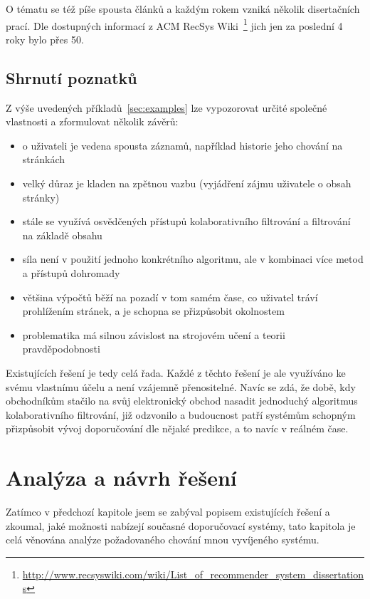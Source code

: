 \documentclass[thesis=M,czech]{FITthesis}[2014/05/07]
\begin{document}
O tématu se též píše spousta článků a každým rokem vzniká několik disertačních prací. Dle dostupných informací z ACM RecSys Wiki~\footnote{\url{http://www.recsyswiki.com/wiki/List_of_recommender_system_dissertations}} jich jen za poslední 4 roky bylo přes 50. 

\section{Shrnutí poznatků}

Z výše uvedených příkladů~\ref{sec:examples} lze vypozorovat určité společné vlastnosti a zformulovat několik závěrů:

\begin{itemize}
	\item o uživateli je vedena spousta záznamů, například historie jeho chování na stránkách
	\item velký důraz je kladen na zpětnou vazbu (vyjádření zájmu uživatele o obsah stránky)
	\item stále se využívá osvědčených přístupů kolaborativního filtrování a filtrování na základě obsahu
	\item síla není v použití jednoho konkrétního algoritmu, ale v kombinaci více metod a přístupů dohromady
	\item většina výpočtů běží na pozadí v tom samém čase, co uživatel tráví prohlížením stránek, a je schopna se přizpůsobit okolnostem
	\item problematika má silnou závislost na strojovém učení a teorii pravděpodobnosti
\end{itemize}

Existujících řešení je tedy celá řada. Každé z těchto řešení je ale využíváno ke svému vlastnímu účelu a není vzájemně přenositelné. Navíc se zdá, že době, kdy obchodníkům stačilo na svůj elektronický obchod nasadit jednoduchý algoritmus kolaborativního filtrování, již odzvonilo a budoucnost patří systémům schopným přizpůsobit vývoj doporučování dle nějaké predikce, a to navíc v reálném čase. 

\chapter{Analýza a návrh řešení}
\label{chap:analysis}

Zatímco v předchozí kapitole jsem se zabýval popisem existujících řešení a zkoumal, jaké možnosti nabízejí současné doporučovací systémy, tato kapitola je celá věnována analýze požadovaného chování mnou vyvíjeného systému.
\end{document}
